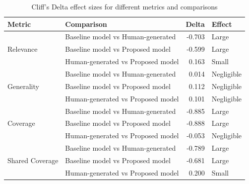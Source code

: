 \begin{table}[h]
    \centering
    \begin{tabular}{llrl}
        \hline
        \textbf{Metric} & \textbf{Comparison} & \textbf{Delta} & \textbf{Effect} \\
        \hline
        \multirow{3}{*}{Relevance}
                        & Baseline model vs Human-generated   & -0.703         & Large           \\
                        & Baseline model vs Proposed model   & -0.599         & Large           \\
                        & Human-generated vs Proposed model      & 0.163          & Small           \\
        \hline
        \multirow{3}{*}{Generality}
                        & Baseline model vs Human-generated   & 0.014          & Negligible      \\
                        & Baseline model vs Proposed model   & 0.112          & Negligible      \\
                        & Human-generated vs Proposed model      & 0.101          & Negligible      \\
        \hline
        \multirow{3}{*}{Coverage}
                        & Baseline model vs Human-generated   & -0.885         & Large           \\
                        & Baseline model vs Proposed model   & -0.888         & Large           \\
                        & Human-generated vs Proposed model      & -0.053         & Negligible      \\
        \hline
        \multirow{3}{*}{Shared Coverage}
                        & Baseline model vs Human-generated   & -0.789         & Large           \\
                        & Baseline model vs Proposed model   & -0.681         & Large           \\
                        & Human-generated vs Proposed model      & 0.200          & Small           \\
        \hline
    \end{tabular}
    \caption{Cliff's Delta effect sizes for different metrics and comparisons}
    \label{tab:cliffs_delta}
\end{table}

